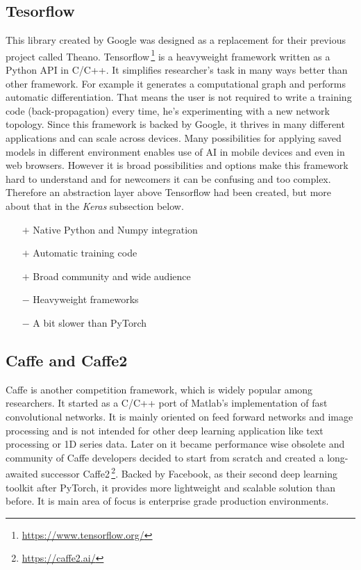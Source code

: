 \subsection{Tesorflow}

This library created by Google was designed as a replacement for their previous project called Theano. Tensorflow\,\footnote{\url{https://www.tensorflow.org/}} is a heavyweight framework written as a Python API in C/C++. It simplifies researcher's task in many ways better than other framework. For example it generates a computational graph and performs automatic differentiation. That means the user is not required to write a training code (back-propagation) every time, he's experimenting with a new network topology. Since this framework is backed by Google, it thrives in many different applications and can scale across devices. Many possibilities for applying saved models in different environment enables use of AI in mobile devices and even in web browsers. However it is broad possibilities and options make this framework hard to understand and for newcomers it can be confusing and too complex. Therefore an abstraction layer above Tensorflow had been created, but more about that in the \textit{Keras} subsection below.

\begin{itemize}
    \item[$\boldsymbol{+}$] Native Python and Numpy integration
    \item[$\boldsymbol{+}$] Automatic training code
    \item[$\boldsymbol{+}$] Broad community and wide audience
    \item[$\boldsymbol{-}$] Heavyweight frameworks
    \item[$\boldsymbol{-}$] A bit slower than PyTorch
\end{itemize}

\subsection{Caffe and Caffe2}

Caffe is another competition framework, which is widely popular among researchers. It started as a C/C++ port of Matlab's implementation of fast convolutional networks. It is mainly oriented on feed forward networks and image processing and is not intended for other deep learning application like text processing or 1D series data. Later on it became performance wise obsolete and community of Caffe developers decided to start from scratch and created a long-awaited successor Caffe2\,\footnote{\url{https://caffe2.ai/}}. Backed by Facebook, as their second deep learning toolkit after PyTorch, it provides more lightweight and scalable solution than before. It is main area of focus is enterprise grade production environments.

